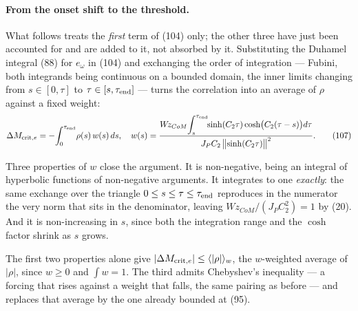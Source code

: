 \documentclass[10pt]{article}
\newcommand{\Wz}{W\!z_{CoM}}
\begin{document}
\paragraph{From the onset shift to the threshold.}
What follows treats the \emph{first} term of (104) only; the other
three have just been accounted for and are added to it, not absorbed by
it. Substituting the Duhamel integral (88) for $e_\omega$ in (104) and
exchanging the order of integration --- Fubini, both integrands being
continuous on a bounded domain, the inner limits changing from
$s\in[0,\tau]$ to $\tau\in[s,\tau_{\rm end}]$ --- turns the correlation
into an average of $\rho$ against a fixed weight:
\begin{equation}
  \Delta M_{{\rm crit},e} = -\!\int_0^{\tau_{\rm end}}\!\rho(s)\,w(s)\,ds,
  \quad
  w(s) = \frac{\Wz\!\displaystyle\int_s^{\tau_{\rm end}}\!\!
                \sinh(C_2\tau)\cosh\bigl(C_2(\tau-s)\bigr)d\tau}
              {J_PC_2\,\bigl\|\sinh(C_2\tau)\bigr\|^{2}} .
  \tag{107}
\end{equation}

Three properties of $w$ close the argument. It is non-negative, being an
integral of hyperbolic functions of non-negative arguments. It
integrates to one \emph{exactly}: the same exchange over the triangle
$0\le s\le\tau\le\tau_{\rm end}$ reproduces in the numerator the very
norm that sits in the denominator, leaving $\Wz/(J_PC_2^{2}) = 1$ by
(20). And it is non-increasing in $s$, since both the integration range
and the $\cosh$ factor shrink as $s$ grows.

The first two properties alone give
$|\Delta M_{{\rm crit},e}| \le \langle|\rho|\rangle_w$, the
$w$-weighted average of $|\rho|$, since $w\ge0$ and $\int w = 1$. The
third admits Chebyshev's inequality --- a forcing that rises against a
weight that falls, the same pairing as before --- and replaces that
average by the one already bounded at (95).
\end{document}
